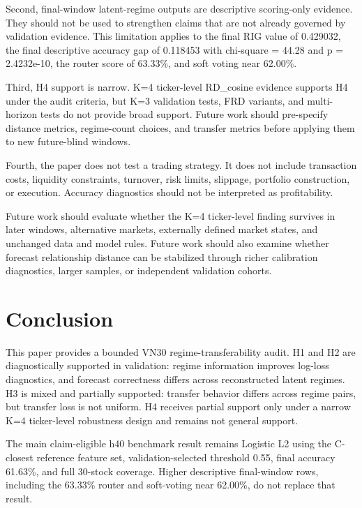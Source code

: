 \documentclass[12pt,a4paper]{article}
\begin{document}
Second, final-window latent-regime outputs are descriptive scoring-only evidence. They should not be used to strengthen claims that are not already governed by validation evidence. This limitation applies to the final RIG value of 0.429032, the final descriptive accuracy gap of 0.118453 with chi-square = 44.28 and p = 2.4232e-10, the router score of 63.33\%, and soft voting near 62.00\%.

Third, H4 support is narrow. K=4 ticker-level RD\_cosine evidence supports H4 under the audit criteria, but K=3 validation tests, FRD variants, and multi-horizon tests do not provide broad support. Future work should pre-specify distance metrics, regime-count choices, and transfer metrics before applying them to new future-blind windows.

Fourth, the paper does not test a trading strategy. It does not include transaction costs, liquidity constraints, turnover, risk limits, slippage, portfolio construction, or execution. Accuracy diagnostics should not be interpreted as profitability.

Future work should evaluate whether the K=4 ticker-level finding survives in later windows, alternative markets, externally defined market states, and unchanged data and model rules. Future work should also examine whether forecast relationship distance can be stabilized through richer calibration diagnostics, larger samples, or independent validation cohorts.

\section{Conclusion}

This paper provides a bounded VN30 regime-transferability audit. H1 and H2 are diagnostically supported in validation: regime information improves log-loss diagnostics, and forecast correctness differs across reconstructed latent regimes. H3 is mixed and partially supported: transfer behavior differs across regime pairs, but transfer loss is not uniform. H4 receives partial support only under a narrow K=4 ticker-level robustness design and remains not general support.

The main claim-eligible h40 benchmark result remains Logistic L2 using the C-closest reference feature set, validation-selected threshold 0.55, final accuracy 61.63\%, and full 30-stock coverage. Higher descriptive final-window rows, including the 63.33\% router and soft-voting near 62.00\%, do not replace that result.
\end{document}
